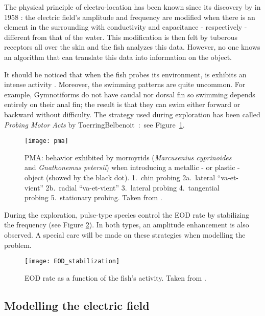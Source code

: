 The physical principle of electro-location has been known since
its discovery by  in 1958
\cite{lissmann1958mechanism}: the electric field's amplitude and
frequency are modified when there is an element in the surrounding
with conductivity and capacitance - respectively - different from
that of the water. This modification is then felt by tuberous
receptors all over the skin and the fish analyzes this data.
However, no one knows an algorithm that can translate this data
into information on the object.

It should be noticed that when the fish probes its environment, is
exhibits an intense activity \cite{lannoo1993electric}. Moreover,
the swimming patterns are quite uncommon. For example,
Gymnotiforms do not have caudal nor dorsal fin so swimming depends
entirely on their anal fin; the result is that they can swim
either forward or backward without difficulty. The strategy used
during exploration has been called \emph{Probing Motor Acts} by
ToerringBelbenoit~\cite{toerring1979motor}:~see
Figure~\ref{fig:pma}. %
\begin{figure}[h]
 \centering \texttt{[image: pma]} \caption{PMA: behavior exhibited by mormyrids (\emph{Marcusenius
 cyprinoides
}and \emph{Gnathonemus petersii}) when introducing a metallic - or
plastic - object (showed by the black dot). 1.~chin probing 2a.~lateral
{}``va-et-vient'' 2b.~radial {}``va-et-vient'' 3.~lateral probing
4.~tangential probing 5.~stationary probing. Taken from \cite{toerring1984locomotor}.\label{fig:pma}}

\end{figure}


During the exploration, pulse-type species control the EOD rate by
stabilizing the frequency (see Figure
\ref{fig:EOD_stabilization}). In both types, an amplitude
enhancement is also observed. A special care will be made on these
strategies when modelling the problem.

%
\begin{figure}[h]
 \centering\texttt{[image: EOD\_stabilization]}

\caption{EOD rate as a function of the fish's activity. Taken from \cite{toerring1984locomotor}.
\label{fig:EOD_stabilization}}

\end{figure}



\subsection{Modelling the electric field}

